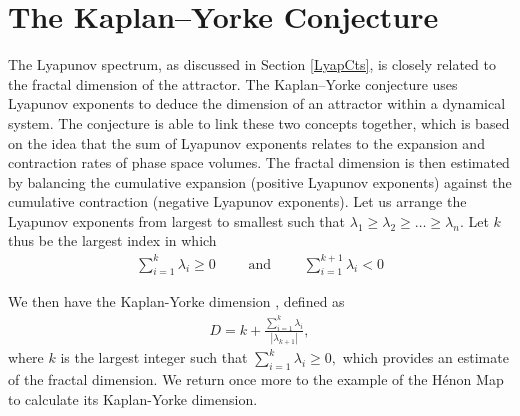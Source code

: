 \section{The Kaplan–Yorke Conjecture}

The Lyapunov spectrum, as discussed in Section \ref{LyapCts}, is closely related to the fractal dimension of the attractor. The Kaplan–Yorke conjecture uses Lyapunov exponents to deduce the dimension of an attractor within a dynamical system.
The conjecture is able to link these two concepts together, which is based on the idea that the sum of Lyapunov exponents relates to the expansion and contraction rates of phase space volumes. 
The fractal dimension is then estimated by balancing the cumulative expansion (positive Lyapunov exponents) against the cumulative contraction (negative Lyapunov exponents). 
Let us arrange the Lyapunov exponents from largest to smallest such that $\lambda_1 \geq \lambda_2 \geq \dots \geq \lambda_n$. Let $k$ thus be the largest index in which
\begin{align}
    \sum_{i=1}^k \lambda_i\geq 0 \quad\quad \text{ and } \quad \quad \sum_{i=1}^{k+1} \lambda_i <0 \label{eq:criteria}
\end{align}

We then have the Kaplan-Yorke dimension \cite{Peitgen1992}, defined as
\begin{align}
    D = k + \frac{\sum_{i=1}^k \lambda_i}{|\lambda_{k+1}|},\label{Kaplan-Yorke}
\end{align} 
where $k$ is the largest integer such that $\sum_{i=1}^k \lambda_i \geq 0,$ which provides an estimate of the fractal dimension. We return once more to the example of the Hénon Map to calculate its Kaplan-Yorke dimension.

